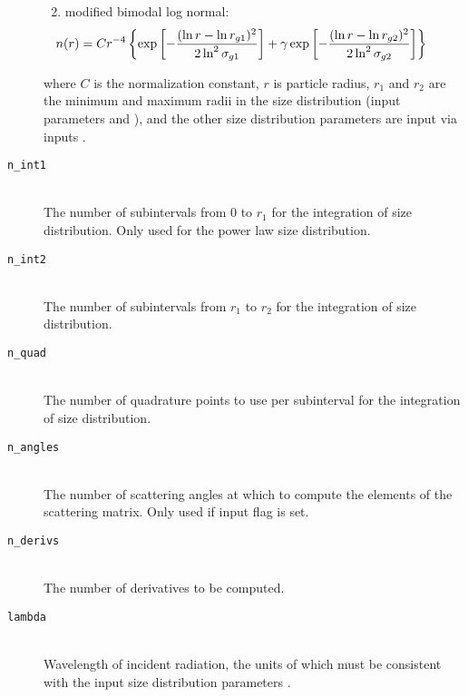 \begin{description}
\begin{enumerate}
\begin{equation}
\label{eq:lmie_inputs_log_normal_dist}
\end{equation}
\item modified bimodal log normal:
\begin{equation}
\hspace*{-0.5in} n(r) = C r^{-4} \left\{\exp\left[-\frac{(\ln r - \ln r_{g1})^{2}}{2 \ln^{2}\sigma_{g1}}\right] + \gamma \exp\left[-\frac{(\ln r - \ln r_{g2})^{2}}{2 \ln^{2}\sigma_{g2}}\right]\right\}
\label{eq:lmie_inputs_modified_bimodal_log_normal_dist}
\end{equation}
\end{enumerate}
where $C$ is the normalization constant, $r$ is particle radius, $r_{1}$ and $r_{2}$ are the minimum and maximum radii in the size distribution (input parameters  and ), and the other size distribution parameters are input via inputs .

\item[\texttt{n\_int1}] \hfill \\
The number of subintervals from 0 to $r_{1}$ for the integration of size distribution.  Only used for the power law size distribution.

\item[\texttt{n\_int2}] \hfill \\
The number of subintervals from $r_{1}$ to $r_{2}$ for the integration of size distribution.

\item[\texttt{n\_quad}] \hfill \\
The number of quadrature points to use per subinterval for the integration of size distribution.

\item[\texttt{n\_angles}] \hfill \\
The number of scattering angles at which to compute the elements of the scattering matrix.  Only used if input flag  is set.

\item[\texttt{n\_derivs}] \hfill \\
The number of derivatives to be computed.

\item[\texttt{lambda}] \hfill \\
Wavelength of incident radiation, the units of which must be consistent with the input size distribution parameters .


\end{description}
